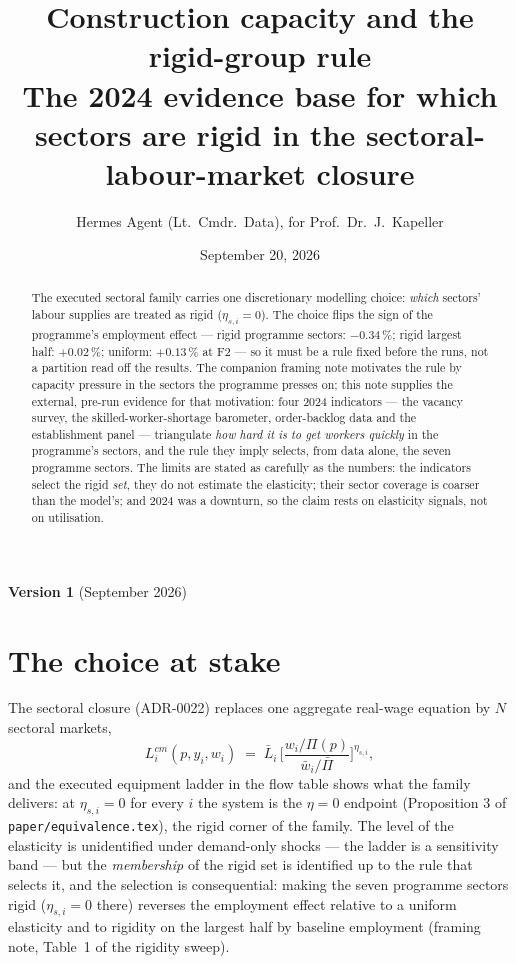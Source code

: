 \documentclass[11pt]{article}
\title{Construction capacity and the rigid-group rule\\[0.4em]
\large The 2024 evidence base for which sectors are rigid in the
sectoral-labour-market closure}
\author{Hermes Agent (Lt.\ Cmdr.\ Data), for Prof.\ Dr.\ J.\ Kapeller}
\date{September 20, 2026}
\begin{document}
\maketitle

\begin{center}\small
\textbf{Version 1} (September 2026)
\end{center}

\begin{abstract}
The executed sectoral family carries one discretionary modelling choice:
\textit{which} sectors' labour supplies are treated as rigid
($\eta_{s,i} = 0$). The choice flips the sign of the programme's employment
effect --- rigid programme sectors: $-0.34\,\%$; rigid largest half:
$+0.02\,\%$; uniform: $+0.13\,\%$ at F2 --- so it must be a rule fixed before
the runs, not a partition read off the results. The companion framing note
motivates the rule by capacity pressure in the sectors the programme presses
on; this note supplies the external, pre-run evidence for that motivation:
four 2024 indicators --- the vacancy survey, the skilled-worker-shortage
barometer, order-backlog data and the establishment panel --- triangulate
\textit{how hard it is to get workers quickly} in the programme's sectors,
and the rule they imply selects, from data alone, the seven programme
sectors. The limits are stated as carefully as the numbers: the indicators
select the rigid \textit{set}, they do not estimate the elasticity; their
sector coverage is coarser than the model's; and 2024 was a downturn, so the
claim rests on elasticity signals, not on utilisation.
\end{abstract}

\section{The choice at stake}\label{sec:stake}

The sectoral closure (ADR-0022) replaces one aggregate real-wage equation by
$N$ sectoral markets,
\begin{equation}
L^{cm}_i(p, y_i, w_i) \;=\; \bar{L}_i\,
\Big[ \frac{w_i / \Pi(p)}{\bar{w}_i / \bar{\Pi}} \Big]^{\eta_{s,i}},
\end{equation}
and the executed equipment ladder in the flow table shows what the family
delivers: at $\eta_{s,i} = 0$ for every $i$ the system is the $\eta = 0$
endpoint (Proposition 3 of \texttt{paper/equivalence.tex}), the rigid corner
of the family. The level of the elasticity is unidentified under
demand-only shocks --- the ladder is a sensitivity band --- but the
\textit{membership} of the rigid set is identified up to the rule that
selects it, and the selection is consequential: making the seven programme
sectors rigid ($\eta_{s,i} = 0$ there) reverses the employment effect
relative to a uniform elasticity and to rigidity on the largest half by
baseline employment (framing note, Table~1 of the rigidity sweep).
\end{document}
